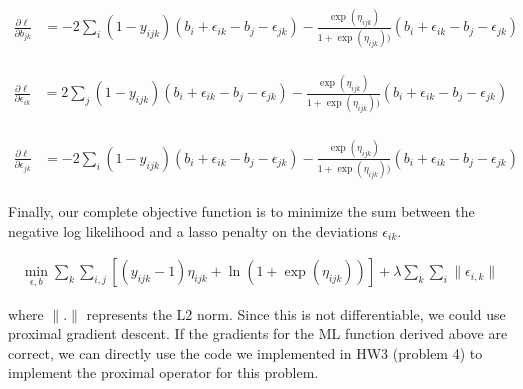 \documentclass[11pt, oneside]{article}   	%
\begin{document}
\begin{align*}
\frac{\partial \ell}{\partial b_{jk}} & = - 2 \sum_{i} (1-y_{ijk}) (b_i + \epsilon_{ik} - b_j - \epsilon_{jk}) - \frac{\exp(\eta_{ijk})}{1+\exp(\eta_{ijk}))}(b_i + \epsilon_{ik} - b_j - \epsilon_{jk}) \\
\end{align*}

\begin{align*}
\frac{\partial \ell}{\partial \epsilon_{ik}} & = 2 \sum_{j} (1-y_{ijk}) (b_i + \epsilon_{ik} - b_j - \epsilon_{jk}) - \frac{\exp(\eta_{ijk})}{1+\exp(\eta_{ijk}))}(b_i + \epsilon_{ik} - b_j - \epsilon_{jk}) \\
\end{align*}

\begin{align*}
\frac{\partial \ell}{\partial \epsilon_{jk}} & = - 2 \sum_{i} (1-y_{ijk}) (b_i + \epsilon_{ik} - b_j - \epsilon_{jk}) - \frac{\exp(\eta_{ijk})}{1+\exp(\eta_{ijk}))}(b_i + \epsilon_{ik} - b_j - \epsilon_{jk}) \\
\end{align*}

Finally, our complete objective function is to minimize the sum between the negative log likelihood and a lasso penalty on the deviations $\epsilon_{ik}$.

\begin{align*}
\min_{\epsilon, b} \sum_k \sum_{i,j} [ (y_{ijk} - 1)\eta_{ijk} +  \ln (1+\exp(\eta_{ijk})) ] + \lambda \sum_k \sum_i \| \epsilon_{i,k}\|
\end{align*}

where $\|.\|$ represents the L2 norm. Since this is not differentiable, we could use proximal gradient descent. If the gradients for the ML function derived above are correct, we can directly use the code we implemented in HW3 (problem 4) to implement the proximal operator for this problem.
\end{document}
